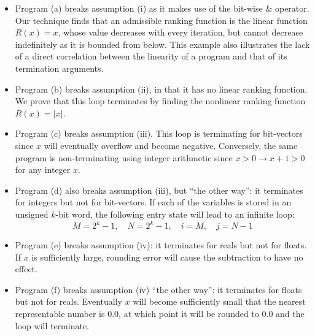 \documentclass[a4paper]{llncs}
\begin{document}
%
\begin{itemize}

\item Program (a) breaks assumption (i) as it makes use of the bit-wise $\&$ operator.
%
Our technique finds that an admissible ranking function is the linear
function $R(x) = x$, whose value decreases with every iteration, but cannot
decrease indefinitely as it is bounded from below.  This example also
illustrates the lack of a direct correlation between the linearity of a
program and that of its termination arguments.

\item Program (b) breaks assumption (ii), in that it has no linear ranking
function.  We prove that this loop terminates by finding the nonlinear
ranking function $R(x) = |x|$.

\item Program (c) breaks assumption (iii).  This loop is terminating for
bit-vectors since $x$ will eventually overflow and become negative. 
Conversely, the same program is non-terminating using integer arithmetic
since $x > 0 \rightarrow x+1 > 0$ for any integer $x$.

\item Program (d) also breaks assumption (iii), but ``the other way'': it
terminates for integers but not for bit-vectors.  If each of the variables
is stored in an unsigned $k$-bit word, the following entry state will lead
to an infinite loop:
%
$$ M = 2^k - 1,\quad N = 2^k - 1,\quad i = M,\quad j = N-1 $$

\item Program (e) breaks assumption (iv): it terminates for reals but not
for floats.  If $x$ is sufficiently large, rounding error will cause the
subtraction to have no effect.

\item Program (f) breaks assumption (iv) ``the other way'': it terminates
for floats but not for reals.  Eventually $x$ will become sufficiently small
that the nearest representable number is $0.0$, at which point it will be
rounded to $0.0$ and the loop will terminate.

\end{itemize}
\end{document}
